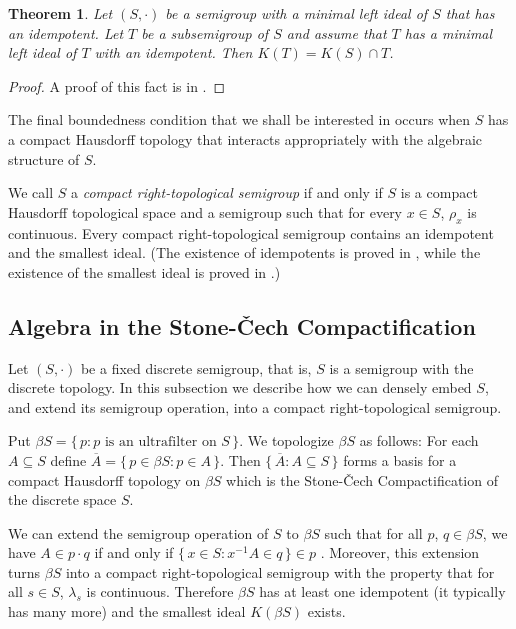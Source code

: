 \documentclass[12pt,showtrims]{memoir}
\theoremstyle{plain}
\newtheorem{thm}{Theorem}[section]
\theoremstyle{definition}
\begin{document}
\begin{thm}
  Let $(S, \cdot)$ be a semigroup with a minimal left ideal of $S$ that has an idempotent. 
  Let $T$ be a subsemigroup of $S$ and assume that $T$ has a minimal left ideal of $T$ with an idempotent.
  Then $K(T) = K(S) \cap T$.
\end{thm}
\begin{proof}
  A proof of this fact is in \cite[Theorem 1.65]{Hindman:1998fk}.
\end{proof}

The final boundedness condition that we shall be interested in occurs when $S$ has a compact Hausdorff topology that interacts appropriately with the algebraic structure of $S$.

We call $S$ a \textsl{compact right-topological semigroup} if and only if $S$ is a compact Hausdorff topological space and a semigroup such that for every $x \in S$, $\rho_x$ is continuous. 
Every compact right-topological semigroup contains an idempotent and the smallest ideal.
(The existence of idempotents is proved in \cite[Theorem 2.5]{Hindman:1998fk}, while the existence of the smallest ideal is proved in \cite[Theorem 2.8]{Hindman:1998fk}.)

\subsection{Algebra in the Stone-\v{C}ech Compactification}
Let $(S, \cdot)$ be a fixed discrete semigroup, that is, $S$ is a semigroup with the discrete topology. 
In this subsection we describe how we can densely embed $S$, and extend its semigroup operation, into a compact right-topological semigroup.

Put $\beta S = \{\, p : \mbox{$p$ is an ultrafilter on $S$} \,\}$.
We topologize $\beta S$ as follows: For each $A \subseteq S$ define $\overline{A} = \{\, p \in \beta S : p \in A \,\}$.
Then $\{\, \overline{A} : A \subseteq S \,\}$ forms a basis for a compact Hausdorff topology on $\beta S$ which is the Stone-\v{C}ech Compactification \cite[Theorem 3.27]{Hindman:1998fk} of the discrete space $S$.

We can extend the semigroup operation of $S$ to $\beta S$ \cite[Theorem 4.1]{Hindman:1998fk} such that for all $p$, $q \in \beta S$, we have $A \in p \cdot q$ if and only if $\{\, x \in S : x^{-1}A \in q \,\} \in p$ \cite[Theorem 4.12(b)]{Hindman:1998fk}.
Moreover, this extension turns $\beta S$ into a compact right-topological semigroup with the property that for all $s \in S$, $\lambda_s$ is continuous. 
Therefore $\beta S$ has at least one idempotent (it typically has many more) and the smallest ideal $K(\beta S)$ exists. 
\end{document}
